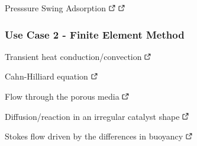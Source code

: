 \documentclass[compress,newPxFont,sthlmFooter]{beamer}
\begin{document}
\begin{frame}[plain]
\begin{itemize}
{          \item \alert{Presssure Swing Adsorption}
                \href{http://doi.org/10.1021/ie801357a}{\includegraphics[align=b, height=0.8em]{link.png}} 
                \href{http://doi.org/10.1021/ie0712582}{\includegraphics[align=b, height=0.8em]{link.png}}
       }
    \end{itemize}
\end{frame}

\begin{frame}[plain]
\frametitle{Use Case 2 - Finite Element Method}
    \begin{itemize}
      {\small
          \item \alert{Transient heat conduction/convection}
                \href{http://daetools.com/docs/tutorials-fe.html\#tutorial-dealii-2}{\includegraphics[align=b, height=0.8em]{link.png}}
          \item \alert{Cahn-Hilliard equation}
                \href{http://daetools.com/docs/tutorials-fe.html\#tutorial-dealii-3}{\includegraphics[align=b, height=0.8em]{link.png}}
          \item \alert{Flow through the porous media}
                \href{http://daetools.com/docs/tutorials-fe.html\#tutorial-dealii-5}{\includegraphics[align=b, height=0.8em]{link.png}}
          \item \alert{Diffusion/reaction in an irregular catalyst shape}
                \href{http://daetools.com/docs/tutorials-fe.html\#tutorial-dealii-6}{\includegraphics[align=b, height=0.8em]{link.png}}
          \item \alert{Stokes flow driven by the differences in buoyancy}
                \href{http://daetools.com/docs/tutorials-fe.html\#tutorial-dealii-7}{\includegraphics[align=b, height=0.8em]{link.png}}
}
\end{itemize}
\end{frame}
\end{document}
